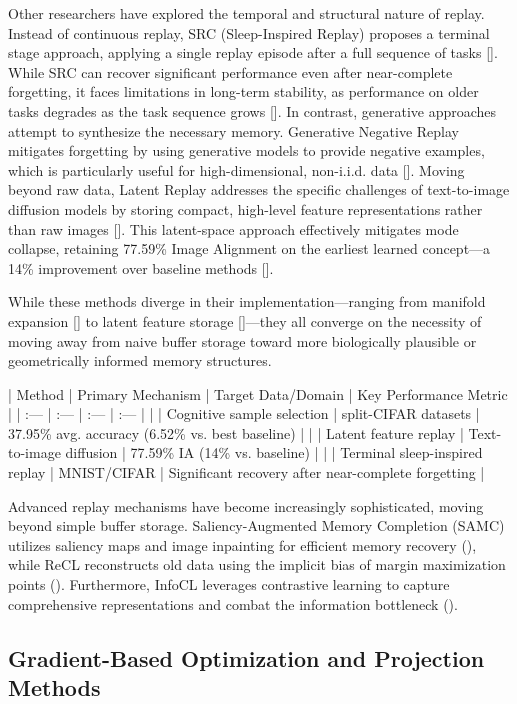 \documentclass[11pt]{article}
\begin{document}
Other researchers have explored the temporal and structural nature of replay. Instead of continuous replay, SRC (Sleep-Inspired Replay) proposes a terminal stage approach, applying a single replay episode after a full sequence of tasks [\citep{2606.08447}]. While SRC can recover significant performance even after near-complete forgetting, it faces limitations in long-term stability, as performance on older tasks degrades as the task sequence grows [\citep{2606.08447}]. In contrast, generative approaches attempt to synthesize the necessary memory. Generative Negative Replay mitigates forgetting by using generative models to provide negative examples, which is particularly useful for high-dimensional, non-i.i.d. data [\citep{2204.05842}]. Moving beyond raw data, Latent Replay addresses the specific challenges of text-to-image diffusion models by storing compact, high-level feature representations rather than raw images [\citep{2509.10529}]. This latent-space approach effectively mitigates mode collapse, retaining 77.59\% Image Alignment on the earliest learned concept—a 14\% improvement over baseline methods [\citep{2509.10529}].

While these methods diverge in their implementation—ranging from manifold expansion [\citep{2310.08038}] to latent feature storage [\citep{2509.10529}]—they all converge on the necessity of moving away from naive buffer storage toward more biologically plausible or geometrically informed memory structures.

| Method | Primary Mechanism | Target Data/Domain | Key Performance Metric |
| :--- | :--- | :--- | :--- |
| \citep{2402.01348} | Cognitive sample selection | split-CIFAR datasets | 37.95\% avg. accuracy (6.52\% vs. best baseline) |
| \citep{2509.10529} | Latent feature replay | Text-to-image diffusion | 77.59\% IA (14\% vs. baseline) |
| \citep{2606.08447} | Terminal sleep-inspired replay | MNIST/CIFAR | Significant recovery after near-complete forgetting |

Advanced replay mechanisms have become increasingly sophisticated, moving beyond simple buffer storage. Saliency-Augmented Memory Completion (SAMC) utilizes saliency maps and image inpainting for efficient memory recovery (\citep{2212.13242}), while ReCL reconstructs old data using the implicit bias of margin maximization points (\citep{2411.06916}). Furthermore, InfoCL leverages contrastive learning to capture comprehensive representations and combat the information bottleneck (\citep{2310.06362}).
\subsection{Gradient-Based Optimization and Projection Methods}
\end{document}
